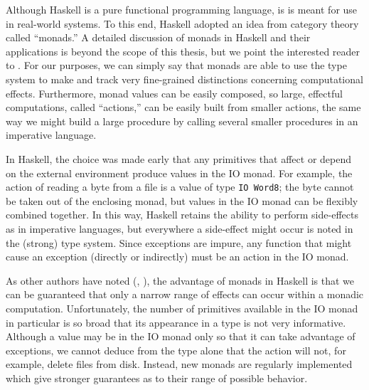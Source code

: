 \documentclass[11pt]{article}
\begin{document}
Although Haskell is a pure functional programming language, is is meant for use in real-world systems.
To this end, Haskell adopted an idea from category theory called ``monads.''
A detailed discussion of monads in Haskell and their applications is beyond the scope of this thesis, but we point the interested reader to \cite{awkwardSquad}.
For our purposes, we can simply say that monads are able to use the type system to make and track very fine-grained distinctions concerning computational effects.
Furthermore, monad values can be easily composed, so large, effectful computations, called ``actions,'' can be easily built from smaller actions, the same way we might build a large procedure by calling several smaller procedures in an imperative language.

In Haskell, the choice was made early that any primitives that affect or depend on the external environment produce values in the IO monad.
For example, the action of reading a byte from a file is a value of type \texttt{IO Word8}; the byte cannot be taken out of the enclosing monad, but values in the IO monad can be flexibly combined together.
In this way, Haskell retains the ability to perform side-effects as in imperative languages, but everywhere a side-effect might occur is noted in the (strong) type system.
Since exceptions are impure, any function that might cause an exception (directly or indirectly) must be an action in the IO monad.

As other authors have noted (\cite{DataTypesALaCarte}, \cite{TheoremsForFree}), the advantage of monads in Haskell is that we can be guaranteed that only a narrow range of effects can occur within a monadic computation.
Unfortunately, the number of primitives available in the IO monad in particular is so broad that its appearance in a type is not very informative.
Although a value may be in the IO monad only so that it can take advantage of exceptions, we cannot deduce from the type alone that the action will not, for example, delete files from disk.
Instead, new monads are regularly implemented which give stronger guarantees as to their range of possible behavior.
\end{document}
